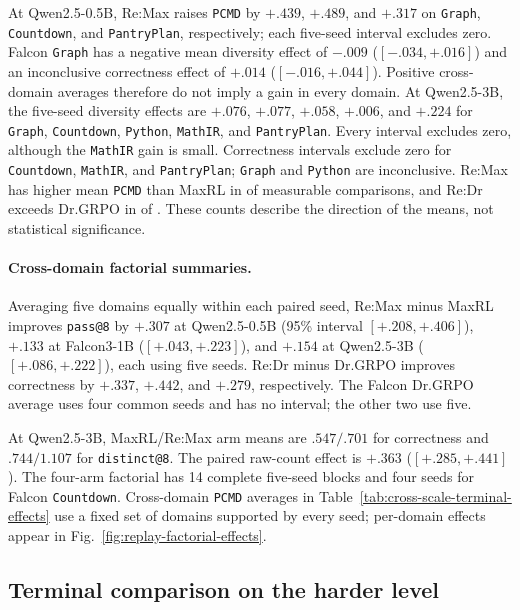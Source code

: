 \documentclass{article}
\makeatletter
\newcommand{\1}{\mathbf 1}
\newcommand{\pmd}{\texttt{PCMD}}
\newcommand{\distk}{\texttt{distinct@8}}
\theoremstyle{remark}
\theoremstyle{definition}
\theoremstyle{plain}
\makeatother
\begin{document}
At Qwen2.5-0.5B, Re:Max raises \pmd{} by $+.439$, $+.489$, and $+.317$ on
\texttt{Graph}, \texttt{Countdown}, and \texttt{PantryPlan}, respectively; each five-seed interval
excludes zero. Falcon \texttt{Graph} has a negative mean diversity effect of $-.009$
($[-.034,+.016]$) and an inconclusive correctness effect of $+.014$
($[-.016,+.044]$). Positive cross-domain averages therefore do not imply a
gain in every domain. At Qwen2.5-3B, the five-seed diversity effects are
$+.076$, $+.077$, $+.058$, $+.006$, and $+.224$ for \texttt{Graph}, \texttt{Countdown}, \texttt{Python},
\texttt{MathIR}, and \texttt{PantryPlan}. Every interval excludes zero, although the \texttt{MathIR}
gain is small. Correctness intervals exclude zero for \texttt{Countdown}, \texttt{MathIR},
and \texttt{PantryPlan}; \texttt{Graph} and \texttt{Python} are inconclusive. Re:Max has higher mean
\pmd{} than MaxRL in \PMDaboveReMax{} of \PMDblocksReMax{} measurable
comparisons, and Re:Dr exceeds Dr.GRPO in \PMDaboveReDr{} of
\PMDblocksReDr{}. These counts describe the direction of the means, not
statistical significance.

\paragraph{Cross-domain factorial summaries.}
\label{app:factorial-numerical-detail}
Averaging five domains equally within each paired seed, Re:Max minus MaxRL
improves \texttt{pass@8} by $+.307$ at Qwen2.5-0.5B (95\% interval
$[+.208,+.406]$), $+.133$ at Falcon3-1B ($[+.043,+.223]$), and $+.154$ at
Qwen2.5-3B ($[+.086,+.222]$), each using five seeds. Re:Dr minus Dr.GRPO
improves correctness by $+.337$, $+.442$, and $+.279$, respectively. The
Falcon Dr.GRPO average uses four common seeds and has no interval; the other
two use five.

At Qwen2.5-3B, MaxRL/Re:Max arm means are $.547/.701$ for correctness and
$.744/1.107$ for \distk{}. The paired raw-count effect is $+.363$
($[+.285,+.441]$). The four-arm factorial has 14 complete five-seed blocks
and four seeds for Falcon \texttt{Countdown}. Cross-domain \pmd{} averages in
Table~\ref{tab:cross-scale-terminal-effects} use a fixed set of domains
supported by every seed; per-domain effects appear in
Fig.~\ref{fig:replay-factorial-effects}.

\subsection{Terminal comparison on the harder level}
\label{app:level2-interim}
\end{document}
